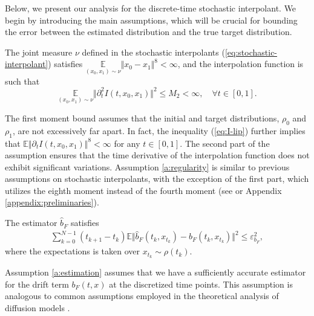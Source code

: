 




Below, we present our analysis for the discrete-time stochastic interpolant.  
We begin by introducing the main assumptions, which will be crucial for bounding the error between the estimated distribution and the true target distribution.
\begin{assumption}
    The joint measure $\nu$ defined in the stochastic interpolants (\ref{eq:stochastic-interpolant}) satisfies $\underset{(x_0,x_1)\sim\nu}{\mathbb{E}}\Vert x_0-x_1\Vert^8<\infty$,  
    and the interpolation function  is such that
    $$\underset{(x_0,x_1)\sim\nu}{\mathbb{E}}\Vert\partial_t^2I(t,x_0,x_1)\Vert^2\le M_2<\infty,\quad \forall t\in[0,1].$$
    \label{a:regularity}
\end{assumption} 
The first moment bound assumes that the initial and target distributions, $\rho_0$ and $\rho_1$, are not excessively far apart. In fact, the inequality (\ref{eq:I-lip}) further implies that $\mathbb{E}\Vert\partial_tI(t,x_0,x_1)\Vert^8<\infty$ for any $t\in[0,1]$. The second part of the assumption ensures that the time derivative of the interpolation function does not exhibit significant variations. Assumption \ref{a:regularity}  is similar to previous assumptions on stochastic interpolants, with the exception of the first part, which utilizes the eighth moment instead of the fourth moment (see \citealt{interpolation} or Appendix \ref{appendix:preliminaries}).

\begin{assumption}
    The estimator $\hat{b}_F$ satisfies 
    $$\begin{aligned}
        \sum_{k=0}^{N-1}(t_{k+1}-t_k)\mathbb{E}\Vert\hat{b}_F(t_k,x_{t_k})-b_F(t_k,x_{t_k})\Vert^2\le\varepsilon_{b_F}^2,
    \end{aligned}$$
    where the expectations is taken over $x_{t_k}\sim\rho(t_k)$.
    \label{a:estimation}
\end{assumption} 
Assumption \ref{a:estimation} assumes that we have a sufficiently accurate estimator for the drift term $b_F(t,x)$ at the discretized time points. This assumption is analogous to common assumptions employed in the theoretical analysis of diffusion models \cite{dlinear, chen2023improved}. 

